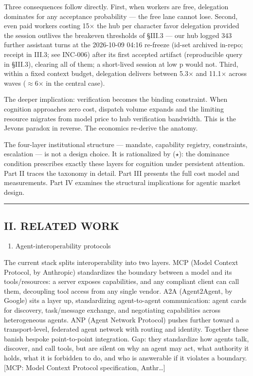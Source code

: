 \documentclass[
]{article}
\providecommand{\tightlist}{%
  \setlength{\itemsep}{0pt}\setlength{\parskip}{0pt}}
\begin{document}
Three consequences follow directly. First, when workers are free,
delegation dominates for any acceptance probability --- the free lane
cannot lose. Second, even paid workers costing 15$\times$ the hub per character
favor delegation provided the session outlives the breakeven thresholds
of \S{}III.3 --- our hub logged 343 further assistant turns at the
2026-10-09 04:16 re-freeze (id-set archived in-repo; receipt in III.3;
see INC-006) after its first accepted artifact (reproducible query in
\S{}III.3), clearing all of them; a short-lived session at low p would not.
Third, within a fixed context budget, delegation delivers between 5.3$\times$
and 11.1$\times$ across waves ($\approx$6$\times$ in the central case).

The deeper implication: verification becomes the binding constraint.
When cognition approaches zero cost, dispatch volume expands and the
limiting resource migrates from model price to hub verification
bandwidth. This is the Jevons paradox in reverse. The economics
re-derive the anatomy.

The four-layer institutional structure --- mandate, capability registry,
constraints, escalation --- is not a design choice. It is rationalized
by ($\star$): the dominance condition prescribes exactly these layers for
cognition under persistent attention. Part II traces the taxonomy in
detail. Part III presents the full cost model and measurements. Part IV
examines the structural implications for agentic market design.

\begin{center}\rule{0.5\linewidth}{0.5pt}\end{center}

\subsection{II. RELATED WORK}\label{ii-related-work}

\begin{enumerate}
\def\labelenumi{\arabic{enumi}.}
\tightlist
\item
  Agent-interoperability protocols
\end{enumerate}

The current stack splits interoperability into two layers. MCP (Model
Context Protocol, by Anthropic) standardizes the boundary between a
model and its tools/resources: a server exposes capabilities, and any
compliant client can call them, decoupling tool access from any single
vendor. A2A (Agent2Agent, by Google) sits a layer up, standardizing
agent-to-agent communication: agent cards for discovery, task/message
exchange, and negotiating capabilities across heterogeneous agents. ANP
(Agent Network Protocol) pushes further toward a transport-level,
federated agent network with routing and identity. Together these banish
bespoke point-to-point integration. Gap: they standardize how agents
talk, discover, and call tools, but are silent on why an agent may act,
what authority it holds, what it is forbidden to do, and who is
answerable if it violates a boundary. {[}MCP: Model Context Protocol
specification, Anthr\ldots{]}
\end{document}
